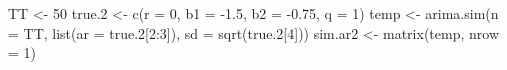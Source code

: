 \begin{Schunk}
\begin{Sinput}
 TT <- 50
 true.2 <- c(r = 0, b1 = -1.5, b2 = -0.75, q = 1)
 temp <- arima.sim(n = TT, list(ar = true.2[2:3]), sd = sqrt(true.2[4]))
 sim.ar2 <- matrix(temp, nrow = 1)
\end{Sinput}
\end{Schunk}
